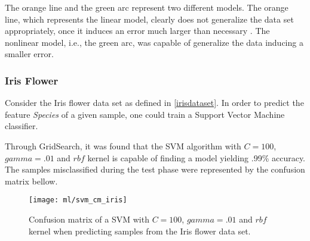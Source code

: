 The orange line and the green arc represent two different models. The orange line, which represents the linear model, clearly does not generalize the data set appropriately, once it induces an error much larger than necessary \cite{roh2015}. The nonlinear model, i.e., the green arc, was capable of generalize the data inducing a smaller error.

\subsubsection{Iris Flower}

Consider the Iris flower data set as defined in \ref{irisdataset}. In order to predict the feature {\em Species} of a given sample, one could train a Support Vector Machine classifier.

Through GridSearch, it was found that the SVM algorithm with $C=100$, $gamma=.01$ and $rbf$ kernel is capable of finding a model yielding .99\% accuracy. The samples misclassified during the test phase were represented by the confusion matrix bellow.

\begin{figure}[H]
	\centering
	\captionsetup{justification=centering}

	\texttt{[image: ml/svm\_cm\_iris]}
	\caption{Confusion matrix of a SVM with $C=100$, $gamma=.01$ and $rbf$ kernel when predicting samples from the Iris flower data set.}
	\label{fig:cmsvmiris}
\end{figure}
